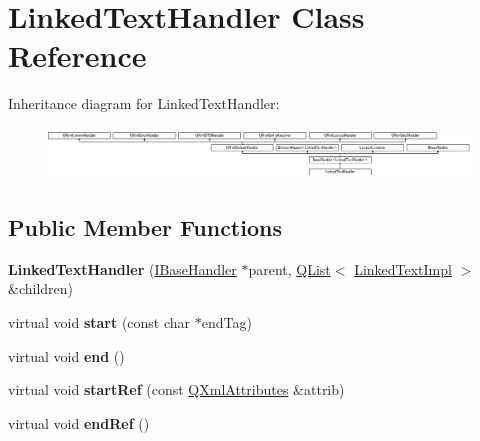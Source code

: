 \hypertarget{class_linked_text_handler}{}\section{Linked\+Text\+Handler Class Reference}
\label{class_linked_text_handler}
Inheritance diagram for Linked\+Text\+Handler\+:\begin{figure}[H]
\begin{center}
\leavevmode
\includegraphics[height=1.350211cm]{class_linked_text_handler}
\end{center}
\end{figure}
\subsection*{Public Member Functions}
\begin{DoxyCompactItemize}
\item 
\mbox{\label{class_linked_text_handler_a8db5ab5dd37008669a0670d49b6d9b54}} 
{\bfseries Linked\+Text\+Handler} (\mbox{\hyperlink{class_i_base_handler}{I\+Base\+Handler}} $\ast$parent, \mbox{\hyperlink{class_q_list}{Q\+List}}$<$ \mbox{\hyperlink{class_linked_text_impl}{Linked\+Text\+Impl}} $>$ \&children)
\item 
\mbox{\label{class_linked_text_handler_a6d13c856b056410266e0a580fbd2c9e9}} 
virtual void {\bfseries start} (const char $\ast$end\+Tag)
\item 
\mbox{\label{class_linked_text_handler_ad01eee83b1454d199496a8815f8dab15}} 
virtual void {\bfseries end} ()
\item 
\mbox{\label{class_linked_text_handler_a5b31e9440c0265e2c3894b42cf6197e1}} 
virtual void {\bfseries start\+Ref} (const \mbox{\hyperlink{class_q_xml_attributes}{Q\+Xml\+Attributes}} \&attrib)
\item 
\mbox{\label{class_linked_text_handler_ac5900b57a7c05598d94d8d8015a1a3eb}} 
virtual void {\bfseries end\+Ref} ()
\end{DoxyCompactItemize}
